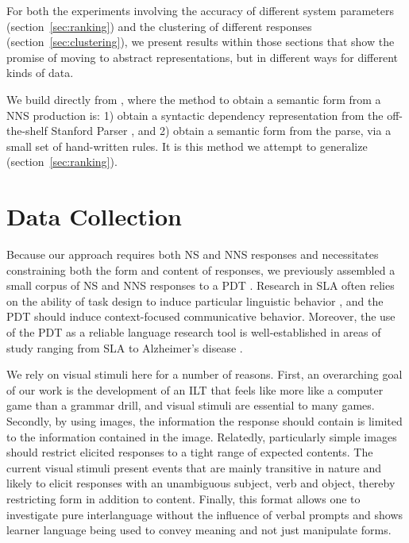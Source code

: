For both the experiments involving the accuracy of different system
parameters (section~\ref{sec:ranking}) and the clustering of different
responses (section~\ref{sec:clustering}), we present results within
those sections that show the promise of moving to abstract representations, but in
different ways for different kinds of data.

We build directly from \citet{king:dickinson:13,king:dickinson:14},
where the method to obtain a semantic form from a NNS production is:
1) obtain a syntactic dependency representation from the off-the-shelf
Stanford Parser \citep{demarneffe:ea:06, klein:manning:03}, and 2)
obtain a semantic form from the parse, via a small set of hand-written
rules.  It is this method we attempt to generalize
(section~\ref{sec:ranking}).

\section{Data Collection}
\label{sec:data}

Because our approach requires both NS and NNS responses and
necessitates constraining both the form and content of responses, we
previously assembled a small corpus of NS and NNS responses to a PDT
\citep{king:dickinson:13}.  Research in SLA often relies on the
ability of task design to induce particular linguistic behavior
\citep{skehan1998assessing}, and the PDT should induce context-focused
communicative behavior.  Moreover, the use of the PDT as a reliable
language research tool is well-established in areas of study ranging
from SLA to Alzheimer's disease \citep{ellis2000task,
forbes2005detecting}.

We rely on visual stimuli here for a number of reasons. First, an overarching goal of our work is the development of an ILT that feels like more like a computer game than a grammar drill, and visual stimuli are essential to many games.
Secondly, by using images, the information the response should contain is limited
to the information contained in the image. Relatedly, particularly
simple images should restrict elicited responses to a tight range of
expected contents. 
The current visual stimuli present events that are mainly
transitive in nature and likely to elicit responses with an
unambiguous subject, verb and object, thereby restricting form in
addition to content. Finally, this format allows one to investigate
pure interlanguage without the influence of verbal prompts and shows
learner language being used to convey meaning and not just manipulate forms.

